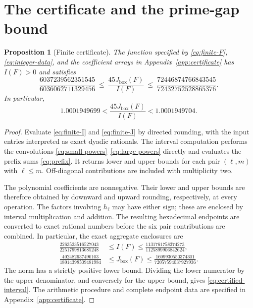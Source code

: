 \documentclass[11pt,reqno]{amsart}
\newtheorem{proposition}[theorem]{Proposition}
\theoremstyle{definition}
\theoremstyle{remark}
\numberwithin{equation}{section}
\newcommand{\Jb}{J_{\mathrm{box}}}
\begin{document}
\section{The certificate and the prime-gap bound}\label{sec:certificate}
\begin{proposition}[Finite certificate]\label{prop:certificate}
The function specified by \eqref{eq:finite-F},
\eqref{eq:integer-data}, and the coefficient arrays in
Appendix~\ref{app:certificate} has $I(F)>0$
and satisfies
\begin{equation}\label{eq:certified-interval}
 \frac{6037239562351545}{6036062711329456}
 \ \le\ \frac{45\Jb(F)}{I(F)}
 \ \le\ \frac{72446874766843545}{72432752528865376}.
\end{equation}
In particular,
\begin{equation}\label{eq:certified-decimal}
 1.0001949699<\frac{45\Jb(F)}{I(F)}<1.0001949704.
\end{equation}
\end{proposition}
\begin{proof}
Evaluate \eqref{eq:finite-I} and \eqref{eq:finite-J} by directed
rounding, with the input entries interpreted as exact dyadic rationals.
The interval computation performs the convolutions
\eqref{eq:small-powers}--\eqref{eq:large-powers} directly and evaluates the
prefix sums \eqref{eq:prefix}. It returns lower and upper bounds for each
pair $(\ell,m)$ with $\ell\le m$. Off-diagonal contributions are included
with multiplicity two.

The polynomial coefficients are nonnegative. Their lower and upper
bounds are therefore obtained by downward and upward rounding,
respectively, at every operation. The factors involving $h_\ell$ may
have either sign; these are enclosed by interval multiplication and
addition. The resulting hexadecimal endpoints are converted to exact
rational numbers before the six pair contributions are combined.
In particular, the exact aggregate enclosures are
\begin{align*}
 \frac{2263523516527043}{2251799813685248}
 &\le I(F)\le\frac{1131761758374273}{1125899906842624},\\
 \frac{402482637490103}{18014398509481984}
 &\le\Jb(F)\le\frac{1609930550374301}{72057594037927936}.
\end{align*}
The norm has a strictly positive lower bound. Dividing the lower
numerator by the upper denominator, and conversely for the upper bound,
gives \eqref{eq:certified-interval}.
The arithmetic procedure and complete endpoint data are specified in
Appendix~\ref{app:certificate}.
\end{proof}
\end{document}
